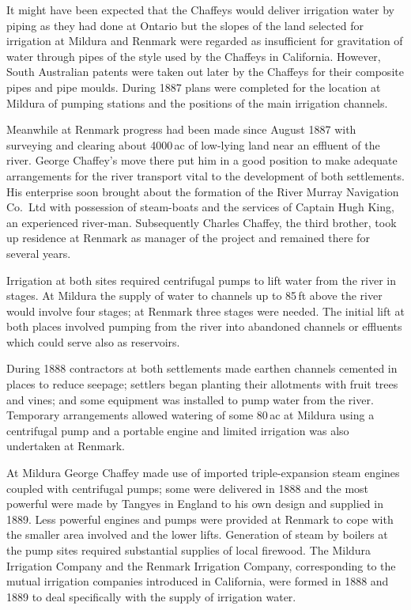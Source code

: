 It might have been expected that the Chaffeys would deliver irrigation
water by piping as they had done at Ontario but the slopes of the land
selected for irrigation at Mildura and Renmark were regarded as
insufficient for gravitation of water through pipes of the style used
by the Chaffeys in California.  However, South Australian patents were
taken out later by the Chaffeys for their composite pipes and pipe
moulds.  During 1887 plans were completed for the location at Mildura
of pumping stations and the positions of the main irrigation
channels.

Meanwhile at Renmark progress had been made since August 1887 with
surveying and clearing about 4000\,ac of low-lying land near an
effluent of the river.  George Chaffey's move there put him in a good
position to make adequate arrangements for the river transport vital
to the development of both settlements.  His enterprise soon brought
about the formation of the River Murray Navigation Co.\ Ltd with
possession of steam-boats and the services of Captain Hugh King, an
experienced river-man.  Subsequently Charles Chaffey, the third
brother, took up residence at Renmark as manager of the project and
remained there for several years.

Irrigation at both sites required centrifugal pumps to lift water from
the river in stages.  At Mildura the supply of water to channels up to
85\,ft above the river would involve four stages; at Renmark three
stages were needed.  The initial lift at both places involved pumping
from the river into abandoned channels or effluents which could serve
also as reservoirs.

During 1888 contractors at both settlements made earthen channels
cemented in places to reduce seepage; settlers began planting their
allotments with fruit trees and vines; and some equipment was
installed to pump water from the river.  Temporary arrangements
allowed watering of some 80\,ac at Mildura using a centrifugal pump
and a portable engine and limited irrigation was also undertaken at
Renmark.

At Mildura George Chaffey made use of imported triple-expansion steam
engines coupled with centrifugal pumps; some were delivered in 1888
and the most powerful were made by Tangyes in England to his own
design and supplied in 1889.  Less powerful engines and pumps were
provided at Renmark to cope with the smaller area involved and the
lower lifts.  Generation of steam by boilers at the pump sites
required substantial supplies of local firewood.  The Mildura
Irrigation Company and the Renmark Irrigation Company, corresponding
to the mutual irrigation companies introduced in California, were
formed in 1888 and 1889 to deal specifically with the supply of
irrigation water.


